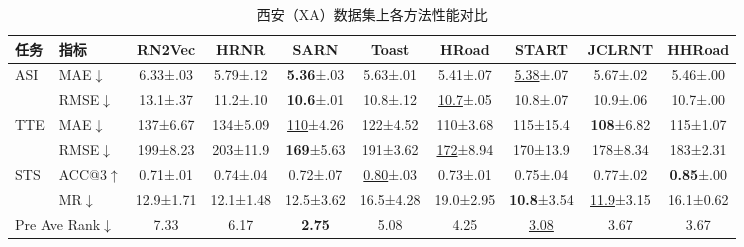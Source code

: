 \begin{table}[H]
    \centering
    \caption{西安（XA）数据集上各方法性能对比}
    \label{tab:HHRoad_xa}
    \small
    \setlength{\tabcolsep}{4pt}
    \renewcommand{\arraystretch}{1.2}
    \begin{tabular}{llcccccccc}
        \toprule
        \textbf{任务} & \textbf{指标}
            & \textbf{RN2Vec} & \textbf{HRNR} & \textbf{SARN}
            & \textbf{Toast} & \textbf{HRoad} & \textbf{START}
            & \textbf{JCLRNT} & \textbf{HHRoad} \\
        \midrule
        \multirow{2}{*}{ASI}
            & MAE$\downarrow$
            & 6.33\tiny{±.03} & 5.79\tiny{±.12} & \textbf{5.36}\tiny{±.03}
            & 5.63\tiny{±.01} & 5.41\tiny{±.07} & \underline{5.38}\tiny{±.07}
            & 5.67\tiny{±.02} & 5.46\tiny{±.00} \\
            & RMSE$\downarrow$
            & 13.1\tiny{±.37} & 11.2\tiny{±.10} & \textbf{10.6}\tiny{±.01}
            & 10.8\tiny{±.12} & \underline{10.7}\tiny{±.05} & 10.8\tiny{±.07}
            & 10.9\tiny{±.06} & 10.7\tiny{±.00} \\
        \cmidrule(lr){1-10}
        \multirow{2}{*}{TTE}
            & MAE$\downarrow$
            & 137\tiny{±6.67} & 134\tiny{±5.09} & \underline{110}\tiny{±4.26}
            & 122\tiny{±4.52} & 110\tiny{±3.68} & 115\tiny{±15.4}
            & \textbf{108}\tiny{±6.82} & 115\tiny{±1.07} \\
            & RMSE$\downarrow$
            & 199\tiny{±8.23} & 203\tiny{±11.9} & \textbf{169}\tiny{±5.63}
            & 191\tiny{±3.62} & \underline{172}\tiny{±8.94} & 170\tiny{±13.9}
            & 178\tiny{±8.34} & 183\tiny{±2.31} \\
        \cmidrule(lr){1-10}
        \multirow{2}{*}{STS}
            & ACC@3$\uparrow$
            & 0.71\tiny{±.01} & 0.74\tiny{±.04} & 0.72\tiny{±.07}
            & \underline{0.80}\tiny{±.03} & 0.73\tiny{±.01} & 0.75\tiny{±.04}
            & 0.77\tiny{±.02} & \textbf{0.85}\tiny{±.00} \\
            & MR$\downarrow$
            & 12.9\tiny{±1.71} & 12.1\tiny{±1.48} & 12.5\tiny{±3.62}
            & 16.5\tiny{±4.28} & 19.0\tiny{±2.95} & \textbf{10.8}\tiny{±3.54}
            & \underline{11.9}\tiny{±3.15} & 16.1\tiny{±0.62} \\
        \midrule
        \multicolumn{2}{l}{Pre Ave Rank$\downarrow$}
            & 7.33 & 6.17 & \textbf{2.75} & 5.08 & 4.25 & \underline{3.08} & 3.67 & 3.67 \\
        \bottomrule
    \end{tabular}
\end{table}

